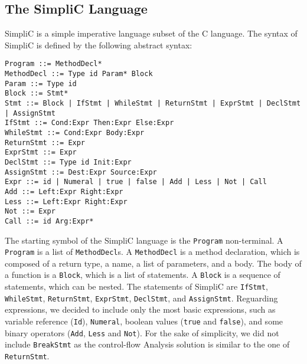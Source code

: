 \subsection{The SimpliC Language}
SimpliC is a simple imperative language subset of the C language.
The syntax of SimpliC is defined by the following abstract syntax:
\begin{lstlisting}[caption={Syntax of the SimpliC language}]
Program ::= MethodDecl*
MethodDecl ::= Type id Param* Block
Param ::= Type id
Block ::= Stmt*
Stmt ::= Block | IfStmt | WhileStmt | ReturnStmt | ExprStmt | DeclStmt | AssignStmt
IfStmt ::= Cond:Expr Then:Expr Else:Expr
WhileStmt ::= Cond:Expr Body:Expr
ReturnStmt ::= Expr
ExprStmt ::= Expr
DeclStmt ::= Type id Init:Expr
AssignStmt ::= Dest:Expr Source:Expr
Expr ::= id | Numeral | true | false | Add | Less | Not | Call
Add ::= Left:Expr Right:Expr
Less ::= Left:Expr Right:Expr
Not ::= Expr
Call ::= id Arg:Expr*
\end{lstlisting}
The starting symbol of the SimpliC language is the \texttt{Program} non-terminal.
A \texttt{Program} is a list of \texttt{MethodDecl}s. A \texttt{MethodDecl} is a method
declaration, which is composed of a return type, a name, a list of parameters, and a body.
The body of a function is a \texttt{Block}, which is a list of statements. A \texttt{Block}
is a sequence of statements, which can be nested. The statements of SimpliC are
\texttt{IfStmt}, \texttt{WhileStmt}, \texttt{ReturnStmt}, \texttt{ExprStmt}, \texttt{DeclStmt},
and \texttt{AssignStmt}. Reguarding expressions, we decided to include only the most basic
expressions, such as variable reference (\texttt{Id}),  \texttt{Numeral}, boolean values (\texttt{true} and \texttt{false}),
and some binary operators (\texttt{Add}, \texttt{Less} and \texttt{Not}).
For the sake of simplicity, we did not include \texttt{BreakStmt} as the control-flow Analysis
solution is similar to the one of \texttt{ReturnStmt}. 

